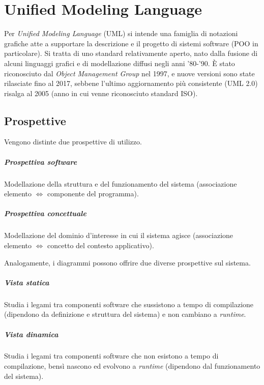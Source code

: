 \chapter{Unified Modeling Language}

Per \textit{Unified Modeling Language} (UML) si intende una famiglia di notazioni grafiche atte a supportare la descrizione e il progetto di sistemi software (POO in particolare). Si tratta di uno standard relativamente aperto, nato dalla fusione di alcuni linguaggi grafici e di modellazione diffusi negli anni '80-'90. È stato riconosciuto dal \textit{Object Management Group} nel 1997, e nuove versioni sono state rilasciate fino al 2017, sebbene l'ultimo aggiornamento più consistente (UML 2.0) risalga al 2005 (anno in cui venne riconosciuto standard ISO).

\section{Prospettive}

Vengono distinte due prospettive di utilizzo.

\paragraph{Prospettiva software} Modellazione della struttura e del funzionamento del sistema (associazione elemento $\Leftrightarrow$ componente del programma).

\paragraph{Prospettiva concettuale} Modellazione del dominio d'interesse in cui il sistema agisce (associazione elemento $\Leftrightarrow$ concetto del contesto applicativo).

Analogamente, i diagrammi possono offrire due diverse prospettive sul sistema.

\paragraph{Vista statica} Studia i legami tra componenti software che sussistono a tempo di compilazione (dipendono da definizione e struttura del sistema) e non cambiano a \textit{runtime}.

\paragraph{Vista dinamica} Studia i legami tra componenti software che non esistono a tempo di compilazione, bensì nascono ed evolvono a \textit{runtime} (dipendono dal funzionamento del sistema).

